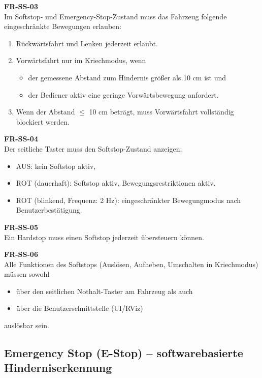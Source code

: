 \textbf{FR-SS-03}\\
Im Softstop- und Emergency-Stop-Zustand muss das Fahrzeug folgende eingeschränkte Bewegungen erlauben:
\begin{enumerate}
    \item Rückwärtsfahrt und Lenken jederzeit erlaubt.
    \item Vorwärtsfahrt nur im Kriechmodus, wenn
    \begin{itemize}
        \item der gemessene Abstand zum Hindernis größer als 10 cm ist und
        \item der Bediener aktiv eine geringe Vorwärtsbewegung anfordert.
    \end{itemize}
    \item Wenn der Abstand $\leq$ 10 cm beträgt, muss Vorwärtsfahrt vollständig blockiert werden.
\end{enumerate}

\textbf{FR-SS-04}\\
Der seitliche Taster muss den Softstop-Zustand anzeigen:
\begin{itemize}
    \item AUS: kein Softstop aktiv,
        \item ROT (dauerhaft): Softstop aktiv, Bewegungsrestriktionen aktiv,
        \item ROT (blinkend, Frequenz: 2 Hz): eingeschränkter Bewegungmodus nach Benutzerbestätigung.
\end{itemize}

\textbf{FR-SS-05}\\
Ein \ac{Hardstop} muss einen Softstop jederzeit übersteuern können.

\textbf{FR-SS-06}\\
Alle Funktionen des Softstops (Auslösen, Aufheben, Umschalten in Kriechmodus) müssen sowohl
\begin{itemize}
    \item über den seitlichen Nothalt-Taster am Fahrzeug als auch
    \item über die Benutzerschnittstelle (UI/RViz)
\end{itemize}
auslösbar sein.


\subsection{Emergency Stop (E-Stop) – softwarebasierte Hinderniserkennung}
\label{sec:emergency_stop}

